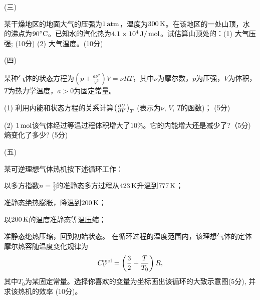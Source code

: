 \documentclass[12pt,CJK]{article}
\begin{document}
\item[(三)]{某干燥地区的地面大气的压强为$1\,\mathrm{atm}$，温度为$300\,\mathrm{K}$。在该地区的一处山顶，水的沸点为$90^\circ \mathrm{C}$。已知水的汽化热为$4.1\times 10^4\,\mathrm{J}/\,\mathrm{mol}$。试估算山顶处的：(1) 大气压强; (10分) (2) 大气温度。(10分)
    
       \vspace{3.2in}
  }
  
\item[(四)]{某种气体的状态方程为$\left(p+\frac{a\nu^2}{V^3}\right)V = \nu R T$，其中$\nu$为摩尔数，$p$为压强，$V$为体积，$T$为热力学温度，$a>0$为固定常量。
    \bitem
  \item[(1)]{利用内能和状态方程的关系计算$\left(\frac{\partial U}{\partial V}\right)_{T}$ (表示为$\nu$, $V$, $T$的函数)； (5分)}
  \item[(2)]{$1\,\mathrm{mol}$该气体经过等温过程体积增大了$10\%$。它的内能增大还是减少了?（5分) 熵变化了多少? (5分)}
    \eitem
    \vspace{3.5in}
  }
  

  \item[(五)]{某可逆理想气体热机按下述循环工作：
      \bitem
    \item{以多方指数$n=\frac{5}{3}$的准静态多方过程从$423\,\mathrm{K}$升温到$777\,\mathrm{K}$；}
    \item{准静态绝热膨胀，降温到$200\,\mathrm{K}$；}
    \item{以$200\,\mathrm{K}$的温度准静态等温压缩；}
    \item{准静态绝热压缩，回到初始状态。}      
      \eitem
      在循环过程的温度范围内，该理想气体的定体摩尔热容随温度变化规律为
      $$C_V^{\rm mol} = \left(\frac{3}{2} + \frac{T}{T_0}\right)R,$$
      其中$T_0$为某固定常量。选择你喜欢的变量为坐标画出该循环的大致示意图(5分), 并求该热机的效率 (10分)。
  }  

\eitem


\ech
\end{document}
